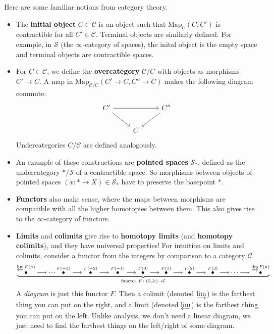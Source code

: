 \begin{example}
    Here are some familiar notions from category theory.
    \begin{itemize}
\setlength\itemsep{-.2em}
        \item The \textbf{initial object} $C \in \mathcal{C} $ is an object such that $\mathrm{Map}_{\mathcal{C} } (C,C')$ is contractible for all $C' \in \mathcal{C} $. Terminal objects are similarly defined. For example, in $\mathcal{S} $ (the $\infty$-category of spaces), the inital object is the empty space and terminal objects are contractible spaces.
        \item For $C \in \mathcal{C} $, we define the \textbf{overcategory} $\mathcal{C} /C$ with objects as morphisms $C' \to C$. A map in $\mathrm{Map}_{\mathcal{C} /C}(C' \to C, C''\to C)$ makes the following diagram commute: \[
        \begin{tikzcd}
            C' \arrow[rr]\arrow[rd]& & C''\arrow[ld] \\
               & C &
        \end{tikzcd}
        \] Undercategories $C / \mathcal{C} $ are defined analogously.
    \item An example of these constructions are \textbf{pointed spaces} $\mathcal{S} _*$, defined as the undercategory $* / \mathcal{S} $ of a contractible space. So morphisms between objects of pointed spaces $(x \colon * \to X) \in \mathcal{S} _*$ have to preserve the basepoint $*$.
    \item \textbf{Functors} also make sense, where the maps between morphisms are compatible with all the higher homotopies between them. This also gives rise to the $\infty$-category of functors.
    \item \textbf{Limits} and \textbf{colimits} give rise to \textbf{homotopy limits} (and \textbf{homotopy colimits}), and they have universal properties! For intuition on limits and colimits, consider a functor from the integers by comparison to a category $\mathcal{C} $. \[
            \underset{\text{functor} \ F \colon (\mathbb{Z},\geq ) \to \mathcal{C} }{\underbrace{  \overset{\varprojlim F(n)}{\bullet} \longrightarrow \cdots \overset{F(-3)}{\bullet } \longrightarrow \overset{F(-2)}{\bullet} \longrightarrow \overset{F(-1)}{\bullet} \longrightarrow \overset{F(0)}{\bullet} \longrightarrow \overset{F(1)}{\bullet } \longrightarrow \overset{F(2)}{\bullet} \longrightarrow \overset{F(3)}{\bullet} \longrightarrow \cdots \longrightarrow \overset{\varinjlim F(n)}{\bullet} }} 
        \] A \emph{diagram} is just this functor $F$. Then a colimit (denoted $\varinjlim$) is the farthest thing you can put on the right, and a limit (denoted $\varprojlim$) is the farthest thing you can put on the left. Unlike analysis, we don't need a linear diagram, we just need to find the farthest things on the left/right of some diagram.

\end{itemize}
\end{example}
